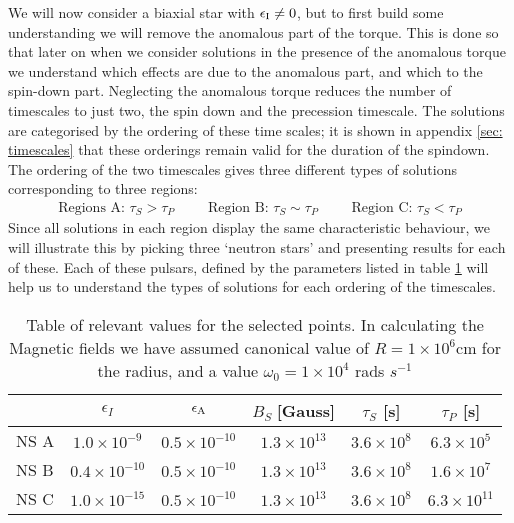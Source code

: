 \documentclass[../full_thesis/full_thesis.tex]{subfiles}
\begin{document}
We will now consider a biaxial star with $\epsilon_{\mathrm{I}}\ne0$, but to first build some
understanding we will remove the anomalous part of the torque. This is done so
that later on when we consider solutions in the presence of the anomalous
torque we understand which effects are due to the anomalous part, and which to
the spin-down part.  Neglecting the anomalous torque reduces the number of
timescales to just two, the spin down and the precession timescale. The
solutions are categorised by the ordering of these time scales; it is shown  in
appendix \ref{sec: timescales} that these orderings remain valid for the
duration of the spindown. The ordering of the two timescales gives three
different types of solutions corresponding to three regions:
\begin{align}
    \textrm{Regions A: } \tau_{S} > \tau_{P} &&&
    \textrm{Region B: } \tau_{S} \sim \tau_{P} &&&
    \textrm{Region C: } \tau_{S} < \tau_{P}
\end{align}
Since all solutions in each region display the same characteristic behaviour,
we will illustrate this by picking three `neutron stars' and presenting results
for each of these. Each of these pulsars, defined by the parameters listed
in table \ref{tab: A B C params} will help us to understand the types of solutions
for each ordering of the timescales.

\renewcommand{\arraystretch}{1.2}
\begin{table}[htb]
\centering
{\small
	\begin{tabular}[h]{|l|c|c|c|c|c|}\hline
		&  $\epsilon_{I}$  & $\epsilon_{\mathrm{A}} $ & 	$B_{S} \; $[Gauss] & $\tau_{S}$ [s] & $ \tau_{P}$  [s] \\ \hline
	NS A 	&  $  1.0\times 10^{-9}  $  & $  0.5\times 10^{-10}  $ & 	$  1.3\times 10^{13}  $   & $  3.6\times 10^{8}  $ & $  6.3\times 10^{5}  $\\
	NS B 	&  $  0.4\times 10^{-10}  $  & $  0.5\times 10^{-10}  $ & 	$  1.3\times 10^{13}  $   & $  3.6\times 10^{8}  $ & $  1.6\times 10^{7}  $\\
	NS C 	&  $  1.0\times 10^{-15}  $  & $  0.5\times 10^{-10}  $ & 	$  1.3\times 10^{13}  $   & $  3.6\times 10^{8}  $ & $  6.3\times 10^{11}  $\\ \hline
	\end{tabular}
}
\caption{Table of relevant values for the selected points. In calculating the
    Magnetic fields we have assumed canonical value of $R=1\times10^{6}$cm for
    the radius, and a value $\omega_{0} = 1\times10^{4}$ rads $s^{-1}$}
\label{tab: A B C params}
\end{table}
\end{document}
